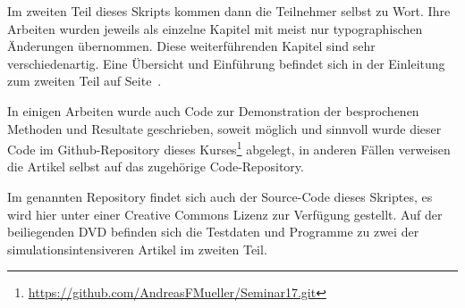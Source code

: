 Im zweiten Teil dieses Skripts kommen dann die Teilnehmer selbst zu Wort.
Ihre Arbeiten wurden jeweils als einzelne
Kapitel mit meist nur typographischen Änderungen übernommen.
Diese weiterführenden Kapitel sind sehr verschiedenartig.
Eine Übersicht und Einführung befindet sich in der Einleitung
zum zweiten Teil auf Seite~\pageref{skript:uebersicht}.

In einigen Arbeiten wurde auch Code zur Demonstration der 
besprochenen Methoden und Resultate geschrieben, soweit
möglich und sinnvoll wurde dieser Code im Github-Repository
dieses Kurses\footnote{\url{https://github.com/AndreasFMueller/Seminar17.git}}
abgelegt, in anderen Fällen verweisen die Artikel selbst auf
das zugehörige Code-Repository.

Im genannten Repository findet sich auch der Source-Code dieses
Skriptes, es wird hier unter einer Creative Commons Lizenz
zur Verfügung gestellt.
Auf der beiliegenden DVD befinden sich die Testdaten und Programme
zu zwei der simulationsintensiveren Artikel im zweiten Teil.


